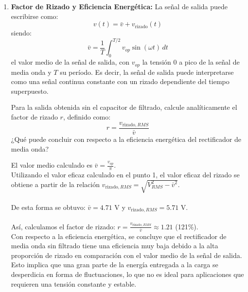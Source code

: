 \begin{enumerate}
    \item \textbf{Factor de Rizado y Eficiencia Energética:}
    La señal de salida puede escribirse como:
    \[ v(t) = \bar{v} + v_{\text{rizado}}(t) \]
    siendo:
    \[ \bar{v} = \frac{1}{T} \int_{0}^{T/2} v_{op} \sin(\omega t) \, dt \]
    el valor medio de la señal de salida, con $v_{op}$ la tensión 0 a pico de la señal de media onda y $T$ su período. Es decir, la señal de salida puede interpretarse como una señal continua constante con un rizado dependiente del tiempo superpuesto.
    
    Para la salida obtenida sin el capacitor de filtrado, calcule analíticamente el factor de rizado $r$, definido como:
    \[ r = \frac{v_{\text{rizado}, RMS}}{\bar{v}} \]
    ¿Qué puede concluir con respecto a la eficiencia energética del rectificador de media onda?
    
    \begin{tcolorbox}[colback=white, colframe=gray!50, title=Respuesta]
        El valor medio calculado es $\bar{v} = \frac{v_{op}}{\pi}$. \\
        Utilizando el valor eficaz calculado en el punto 1, el valor eficaz del rizado se obtiene a partir de la relación $v_{\text{rizado}, RMS} = \sqrt{V_{RMS}^2 - \bar{v}^2}$.\\\\
        De esta forma se obtuvo: $\bar{v} = \text{4.71 V}$ y $v_{\text{rizado}, RMS} = \text{5.71 V}$. \\
        \\
        Así, calculamos el factor de rizado: $r = \frac{v_{\text{rizado}, RMS}}{\bar{v}} \approx 1.21$ (121\%). \\
        Con respecto a la eficiencia energética, se concluye que el rectificador de media onda sin filtrado tiene una eficiencia muy baja debido a la alta proporción de rizado en comparación con el valor medio de la señal de salida. Esto implica que una gran parte de la energía entregada a la carga se desperdicia en forma de fluctuaciones, lo que no es ideal para aplicaciones que requieren una tensión constante y estable.
    \end{tcolorbox}
\end{enumerate}
